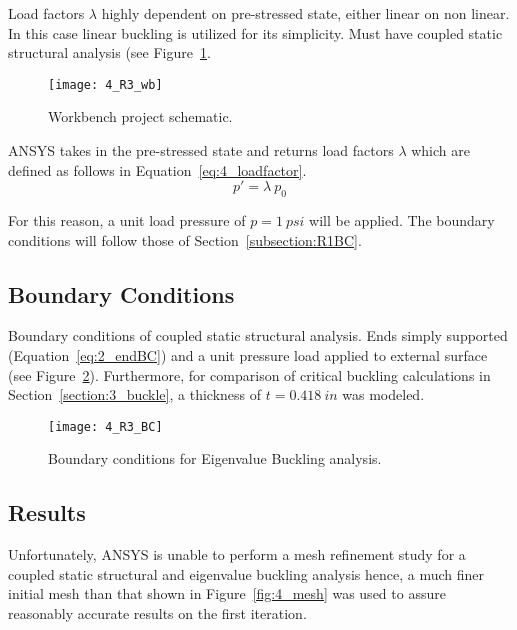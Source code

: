 Load factors $\lambda$ highly dependent on pre-stressed state, either linear on non linear.\\

In this case linear buckling is utilized for its simplicity. Must have coupled static structural analysis (see Figure~\ref{fig:4_R3_wb}.

\begin{figure}[H]
	\centering
	\texttt{[image: 4\_R3\_wb]}
	\caption{Workbench project schematic.}
	\label{fig:4_R3_wb}
\end{figure}

ANSYS takes in the pre-stressed state and returns load factors $\lambda$ which are defined as follows in Equation~\ref{eq:4_loadfactor}.
\begin{equation}
	\label{eq:4_loadfactor}
	p' = \lambda \ p_0
\end{equation}

For this reason, a unit load pressure of $p = 1\ psi$ will be applied. The boundary conditions will follow those of Section~\ref{subsection:R1BC}.

\subsection{Boundary Conditions}

Boundary conditions of coupled static structural analysis. Ends simply supported (Equation~\ref{eq:2_endBC}) and a unit pressure load applied to external surface (see Figure~\ref{fig:4_R3_BC}). Furthermore, for comparison of critical buckling calculations in Section~\ref{section:3_buckle}, a thickness of $t=0.418\ in$ was modeled. 

\begin{figure}[H]
	\centering
	\texttt{[image: 4\_R3\_BC]}
	\caption{Boundary conditions for Eigenvalue Buckling analysis.}
	\label{fig:4_R3_BC}
\end{figure}

\subsection{Results}

Unfortunately, ANSYS is unable to perform a mesh refinement study for a coupled static structural and eigenvalue buckling analysis hence, a much finer initial mesh than that shown in Figure~\ref{fig:4_mesh} was used to assure reasonably accurate results on the first iteration.\\


